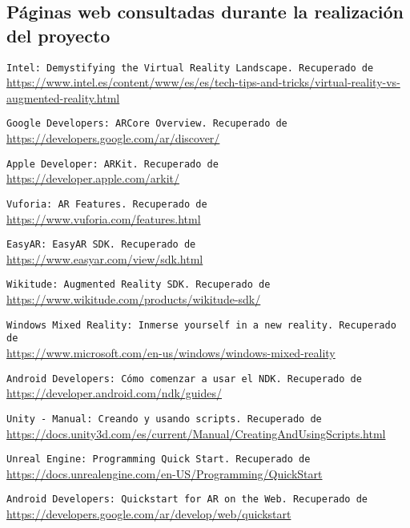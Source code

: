 
\subsection*{Páginas web consultadas durante la realización del proyecto}

{\tt Intel: Demystifying the Virtual Reality Landscape. Recuperado de }\\
\url{https://www.intel.es/content/www/es/es/tech-tips-and-tricks/virtual-reality-vs-augmented-reality.html}

{\tt Google Developers: ARCore Overview. Recuperado de }\\
\url{https://developers.google.com/ar/discover/}

{\tt Apple Developer: ARKit. Recuperado de }\\
\url{https://developer.apple.com/arkit/}

{\tt Vuforia: AR Features. Recuperado de }\\
\url{https://www.vuforia.com/features.html}

{\tt EasyAR: EasyAR SDK. Recuperado de }\\
\url{https://www.easyar.com/view/sdk.html}

{\tt Wikitude: Augmented Reality SDK. Recuperado de }\\
\url{https://www.wikitude.com/products/wikitude-sdk/}

{\tt Windows Mixed Reality: Inmerse yourself in a new reality. Recuperado de }\\
\url{https://www.microsoft.com/en-us/windows/windows-mixed-reality}

{\tt Android Developers: Cómo comenzar a usar el NDK. Recuperado de }\\
\url{https://developer.android.com/ndk/guides/}

{\tt Unity - Manual: Creando y usando scripts. Recuperado de }\\
\url{https://docs.unity3d.com/es/current/Manual/CreatingAndUsingScripts.html}

{\tt Unreal Engine: Programming Quick Start. Recuperado de }\\
\url{https://docs.unrealengine.com/en-US/Programming/QuickStart}

{\tt Android Developers: Quickstart for AR on the Web. Recuperado de }\\
\url{https://developers.google.com/ar/develop/web/quickstart}

